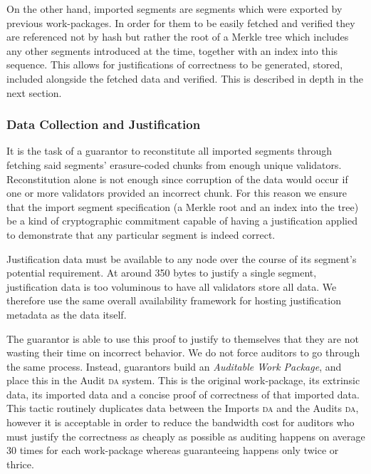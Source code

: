 On the other hand, imported segments are segments which were exported by previous work-packages. In order for them to be easily fetched and verified they are referenced not by hash but rather the root of a Merkle tree which includes any other segments introduced at the time, together with an index into this sequence. This allows for justifications of correctness to be generated, stored, included alongside the fetched data and verified. This is described in depth in the next section.

\subsubsection{Data Collection and Justification}


It is the task of a guarantor to reconstitute all imported segments through fetching said segments' erasure-coded chunks from enough unique validators. Reconstitution alone is not enough since corruption of the data would occur if one or more validators provided an incorrect chunk. For this reason we ensure that the import segment specification (a Merkle root and an index into the tree) be a kind of cryptographic commitment capable of having a justification applied to demonstrate that any particular segment is indeed correct.

Justification data must be available to any node over the course of its segment's potential requirement. At around 350 bytes to justify a single segment, justification data is too voluminous to have all validators store all data. We therefore use the same overall availability framework for hosting justification metadata as the data itself.

The guarantor is able to use this proof to justify to themselves that they are not wasting their time on incorrect behavior. We do not force auditors to go through the same process. Instead, guarantors build an \emph{Auditable Work Package}, and place this in the Audit \textsc{da} system. This is the original work-package, its extrinsic data, its imported data and a concise proof of correctness of that imported data. This tactic routinely duplicates data between the Imports \textsc{da} and the Audits \textsc{da}, however it is acceptable in order to reduce the bandwidth cost for auditors who must justify the correctness as cheaply as possible as auditing happens on average 30 times for each work-package whereas guaranteeing happens only twice or thrice.

